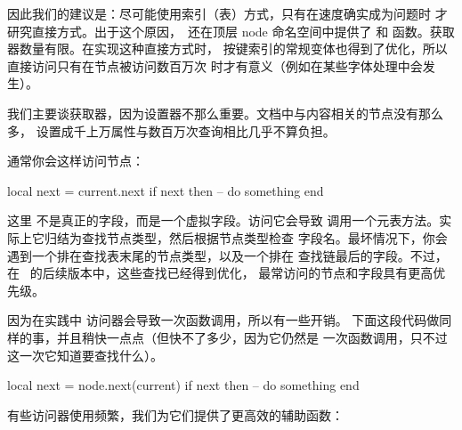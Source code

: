 因此我们的建议是：尽可能使用索引（表）方式，只有在速度确实成为问题时
才研究直接方式。出于这个原因，\LUATEX\ 还在顶层 node 命名空间中提供了
 和  函数。获取器数量有限。在实现这种直接方式时，
按键索引的常规变体也得到了优化，所以直接访问只有在节点被访问数百万次
时才有意义（例如在某些字体处理中会发生）。

我们主要谈获取器，因为设置器不那么重要。文档中与内容相关的节点没有那么多，
设置成千上万属性与数百万次查询相比几乎不算负担。

通常你会这样访问节点：

\begin{typing}
local next = current.next
if next then
    -- do something
end
\end{typing}

这里  不是真正的字段，而是一个虚拟字段。访问它会导致
调用一个元表方法。实际上它归结为查找节点类型，然后根据节点类型检查
字段名。最坏情况下，你会遇到一个排在查找表末尾的节点类型，以及一个排在
查找链最后的字段。不过，在 \LUATEX\ 的后续版本中，这些查找已经得到优化，
最常访问的节点和字段具有更高优先级。

因为在实践中  访问器会导致一次函数调用，所以有一些开销。
下面这段代码做同样的事，并且稍快一点点（但快不了多少，因为它仍然是
一次函数调用，只不过这一次它知道要查找什么）。

\begin{typing}
local next = node.next(current)
if next then
    -- do something
end
\end{typing}

有些访问器使用频繁，我们为它们提供了更高效的辅助函数：

